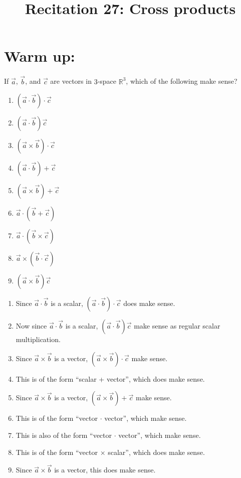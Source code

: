\documentclass[]{ximera}
\title{Recitation 27: Cross products}
\begin{document}
\begin{abstract}		\end{abstract}
\maketitle



\section{Warm up:}
If $\vec{a}$, $\vec{b}$, and $\vec{c}$ are vectors in $3$-space $\mathbb{R}^3$, which of the following make sense?
	\begin{multicols}{3}
	\begin{enumerate}
	\item  $(\vec{a} \cdot \vec{b}) \cdot \vec{c}$
	\item  $(\vec{a} \cdot \vec{b})\vec{c}$
	\item  $(\vec{a} \times \vec{b}) \cdot \vec{c}$
	\item  $(\vec{a} \cdot \vec{b}) + \vec{c}$
	\item  $(\vec{a} \times \vec{b}) + \vec{c}$
	\item  $\vec{a} \cdot (\vec{b} + \vec{c})$
	\item  $\vec{a} \cdot (\vec{b} \times \vec{c})$
	\item  $\vec{a} \times (\vec{b} \cdot \vec{c})$
	\item  $(\vec{a} \times \vec{b}) \vec{c}$
	\end{enumerate}
	\end{multicols}
	
	\begin{freeResponse}
	\begin{enumerate}
	\item  Since $\vec{a} \cdot \vec{b}$ is a scalar, $(\vec{a} \cdot \vec{b}) \cdot \vec{c}$ does  make sense.
	\item  Now since $\vec{a} \cdot \vec{b}$ is a scalar, $(\vec{a} \cdot \vec{b})\vec{c}$  make sense as regular scalar multiplication.
	\item  Since $\vec{a} \times \vec{b}$ is a vector, $(\vec{a} \times \vec{b}) \cdot \vec{c}$  make sense.
	\item  This is of the form ``scalar + vector'', which does  make sense.
	\item  Since $\vec{a} \times \vec{b}$ is a vector, $(\vec{a} \times \vec{b}) + \vec{c}$  make sense.
	\item  This is of the form ``vector $\cdot$ vector'', which  make sense.
	\item  This is also of the form ``vector $\cdot$ vector'', which  make sense.
	\item  This is of the form ``vector $\times$ scalar'', which does  make sense.
	\item  Since $\vec{a} \times \vec{b}$ is a vector, this does  make sense.
	\end{enumerate}
	\end{freeResponse}
	
\end{document}

